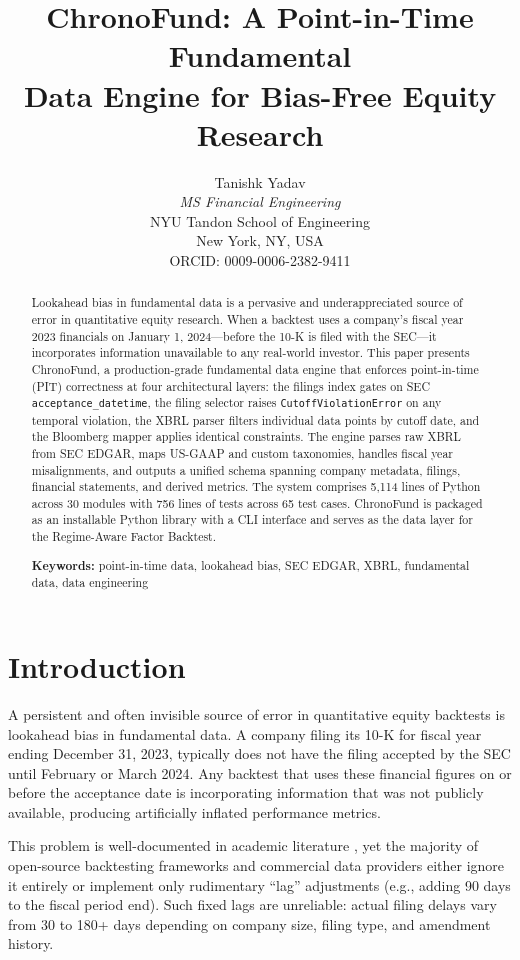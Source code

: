 \documentclass[11pt]{article}
\title{\textbf{ChronoFund: A Point-in-Time Fundamental\\Data Engine for Bias-Free Equity Research}}
\author{Tanishk Yadav\\[2pt]\textit{MS Financial Engineering}\\NYU Tandon School of Engineering\\New York, NY, USA\\[2pt]ORCID: 0009-0006-2382-9411}
\date{}
\begin{document}
\maketitle

\begin{abstract}
\noindent
Lookahead bias in fundamental data is a pervasive and underappreciated source of error in quantitative equity research. When a backtest uses a company's fiscal year 2023 financials on January 1, 2024---before the 10-K is filed with the SEC---it incorporates information unavailable to any real-world investor. This paper presents ChronoFund, a production-grade fundamental data engine that enforces point-in-time (PIT) correctness at four architectural layers: the filings index gates on SEC \texttt{acceptance\_datetime}, the filing selector raises \texttt{CutoffViolationError} on any temporal violation, the XBRL parser filters individual data points by cutoff date, and the Bloomberg mapper applies identical constraints. The engine parses raw XBRL from SEC EDGAR, maps US-GAAP and custom taxonomies, handles fiscal year misalignments, and outputs a unified schema spanning company metadata, filings, financial statements, and derived metrics. The system comprises 5,114 lines of Python across 30 modules with 756 lines of tests across 65 test cases. ChronoFund is packaged as an installable Python library with a CLI interface and serves as the data layer for the Regime-Aware Factor Backtest.

\medskip
\noindent\textbf{Keywords:} point-in-time data, lookahead bias, SEC EDGAR, XBRL, fundamental data, data engineering
\end{abstract}

\section{Introduction}

A persistent and often invisible source of error in quantitative equity backtests is lookahead bias in fundamental data. A company filing its 10-K for fiscal year ending December 31, 2023, typically does not have the filing accepted by the SEC until February or March 2024. Any backtest that uses these financial figures on or before the acceptance date is incorporating information that was not publicly available, producing artificially inflated performance metrics.

This problem is well-documented in academic literature \citep{banz1986}, yet the majority of open-source backtesting frameworks and commercial data providers either ignore it entirely or implement only rudimentary ``lag'' adjustments (e.g., adding 90 days to the fiscal period end). Such fixed lags are unreliable: actual filing delays vary from 30 to 180+ days depending on company size, filing type, and amendment history.
\end{document}
